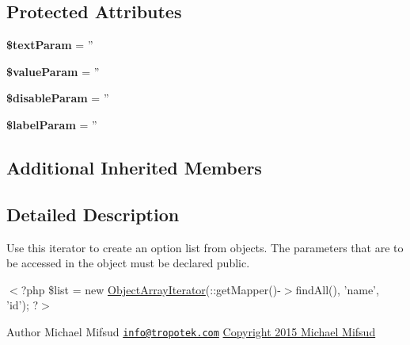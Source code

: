 \subsection*{Protected Attributes}
\begin{DoxyCompactItemize}
\item 
\hypertarget{classTk_1_1Form_1_1Field_1_1Option_1_1ObjectArrayIterator_a3dbc86e230251664923d027e0366b51b}{{\bfseries \$text\+Param} = ''}\label{classTk_1_1Form_1_1Field_1_1Option_1_1ObjectArrayIterator_a3dbc86e230251664923d027e0366b51b}

\item 
\hypertarget{classTk_1_1Form_1_1Field_1_1Option_1_1ObjectArrayIterator_a57a2232c350083915cac48668c72a265}{{\bfseries \$value\+Param} = ''}\label{classTk_1_1Form_1_1Field_1_1Option_1_1ObjectArrayIterator_a57a2232c350083915cac48668c72a265}

\item 
\hypertarget{classTk_1_1Form_1_1Field_1_1Option_1_1ObjectArrayIterator_a93a55bf02c6f08c3b4dfd8a02dea1ac9}{{\bfseries \$disable\+Param} = ''}\label{classTk_1_1Form_1_1Field_1_1Option_1_1ObjectArrayIterator_a93a55bf02c6f08c3b4dfd8a02dea1ac9}

\item 
\hypertarget{classTk_1_1Form_1_1Field_1_1Option_1_1ObjectArrayIterator_aad95d9abdab9f11fa3f10ffb4a5dd4fb}{{\bfseries \$label\+Param} = ''}\label{classTk_1_1Form_1_1Field_1_1Option_1_1ObjectArrayIterator_aad95d9abdab9f11fa3f10ffb4a5dd4fb}

\end{DoxyCompactItemize}
\subsection*{Additional Inherited Members}


\subsection{Detailed Description}
Use this iterator to create an option list from objects. The parameters that are to be accessed in the object must be declared public.

$<$?php \$list = new \hyperlink{classTk_1_1Form_1_1Field_1_1Option_1_1ObjectArrayIterator}{Object\+Array\+Iterator}(\+::get\+Mapper()-\/$>$find\+All(), 'name', 'id'); ?$>$

\begin{DoxyAuthor}{Author}
Michael Mifsud \href{mailto:info@tropotek.com}{\tt info@tropotek.\+com} \hyperlink{}{Copyright 2015 Michael Mifsud }
\end{DoxyAuthor}


